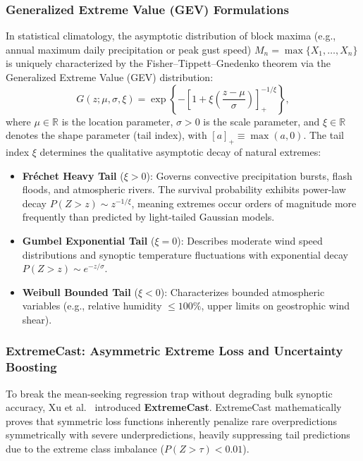 \subsubsection{Generalized Extreme Value (GEV) Formulations}
In statistical climatology, the asymptotic distribution of block maxima (e.g., annual maximum daily precipitation or peak gust speed) $M_n = \max\{X_1, \dots, X_n\}$ is uniquely characterized by the Fisher--Tippett--Gnedenko theorem via the Generalized Extreme Value (GEV) distribution:
\begin{equation}
    G(z; \mu, \sigma, \xi) = \exp\left\{ - \left[ 1 + \xi \left( \frac{z - \mu}{\sigma} \right) \right]_+^{-1/\xi} \right\},
    \label{eq:gev_distribution}
\end{equation}
where $\mu \in \mathbb{R}$ is the location parameter, $\sigma > 0$ is the scale parameter, and $\xi \in \mathbb{R}$ denotes the shape parameter (tail index), with $[a]_+ \equiv \max(a, 0)$. The tail index $\xi$ determines the qualitative asymptotic decay of natural extremes:
\begin{itemize}
    \item \textbf{Fréchet Heavy Tail} ($\xi > 0$): Governs convective precipitation bursts, flash floods, and atmospheric rivers. The survival probability exhibits power-law decay $P(Z > z) \sim z^{-1/\xi}$, meaning extremes occur orders of magnitude more frequently than predicted by light-tailed Gaussian models.
    \item \textbf{Gumbel Exponential Tail} ($\xi = 0$): Describes moderate wind speed distributions and synoptic temperature fluctuations with exponential decay $P(Z > z) \sim e^{-z/\sigma}$.
    \item \textbf{Weibull Bounded Tail} ($\xi < 0$): Characterizes bounded atmospheric variables (e.g., relative humidity $\le 100\%$, upper limits on geostrophic wind shear).
\end{itemize}

\subsubsection{ExtremeCast: Asymmetric Extreme Loss and Uncertainty Boosting}
To break the mean-seeking regression trap without degrading bulk synoptic accuracy, Xu et al.~\cite{xu2024extremecast} introduced \textbf{ExtremeCast}. ExtremeCast mathematically proves that symmetric loss functions inherently penalize rare overpredictions symmetrically with severe underpredictions, heavily suppressing tail predictions due to the extreme class imbalance ($P(Z > \tau) < 0.01$).

